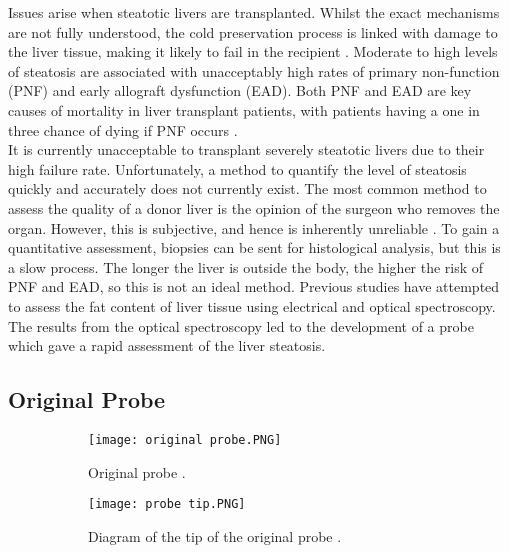 Issues arise when steatotic livers are transplanted. Whilst the exact mechanisms are not fully understood, the cold preservation process is linked with damage to the liver tissue, making it likely to fail in the recipient \cite{Imber2002}. Moderate to high levels of steatosis are associated with unacceptably high rates of primary non-function (PNF) and early allograft dysfunction (EAD). Both PNF and EAD are key causes of mortality in liver transplant patients, with patients having a one in three chance of dying if PNF occurs \cite{Robertson}.\\

It is currently unacceptable to transplant severely steatotic livers due to their high failure rate. Unfortunately, a method to quantify the level of steatosis quickly and accurately does not currently exist. The most common method to assess the quality of a donor liver is the opinion of the surgeon who removes the organ. However, this is subjective, and hence is inherently unreliable \cite{Robertson}. To gain a quantitative assessment, biopsies can be sent for histological analysis, but this is a slow process. The longer the liver is outside the body, the higher the risk of PNF and EAD, so this is not an ideal method. Previous studies \cite{McLaughlin2010} have attempted to assess the fat content of liver tissue using electrical and optical spectroscopy. The results from the optical spectroscopy led to the development of a probe \cite{Robertson} which gave a rapid assessment of the liver steatosis. 


\subsection{Original Probe}

\begin{figure}[htb]
	\centering
	\begin{subfigure}[b]{0.3\linewidth}
		\texttt{[image: original probe.PNG]}
		\caption{Original probe \cite{Robertson}.}
		\label{fig: original probe}
	\end{subfigure}
	\begin{subfigure}[b]{0.5\linewidth}
		\texttt{[image: probe tip.PNG]}
		\caption{Diagram of the tip of the original probe \cite{Robertson}.}
		\label{fig: probe tip}
	\end{subfigure}
	\caption{}
\end{figure}

